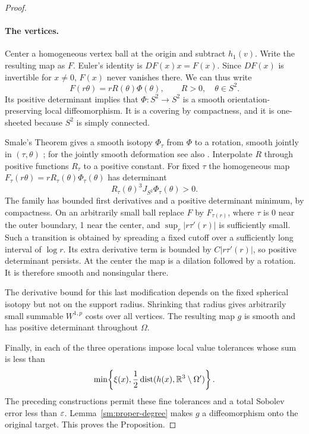 \begin{proof}
\paragraph{The vertices.}
Center a homogeneous vertex ball at the origin and subtract
$h_1(v)$.  Write the resulting map as $F$.  Euler's identity is
$DF(x)x=F(x)$.  Since $DF(x)$ is invertible for $x\ne0$, $F(x)$
never vanishes there.  We can thus write
\begin{equation}
 \label{sm:vertex-form}
 F(r\theta)=rR(\theta)\Phi(\theta),\qquad
 R>0,\quad\theta\in S^2.
\end{equation}
Its positive determinant implies that $\Phi:S^2\to S^2$ is a
smooth orientation-preserving local diffeomorphism.  It is a
covering by compactness, and it is one-sheeted because $S^2$ is
simply connected.

Smale's Theorem gives a smooth isotopy $\Phi_\tau$ from $\Phi$
to a rotation, smooth jointly in $(\tau,\theta)$
\cite[Theorem~6]{Smale1959}; for the jointly smooth deformation see also
\cite[Theorem~1.5]{LiWatts2011}.  Interpolate $R$ through positive
functions $R_\tau$ to a positive constant.  For fixed $\tau$ the
homogeneous map
$F_\tau(r\theta)=rR_\tau(\theta)\Phi_\tau(\theta)$
has determinant
\[
 R_\tau(\theta)^3 J_{S^2}\Phi_\tau(\theta)>0.
\]
The family has bounded first derivatives and a positive
determinant minimum, by compactness.  On an arbitrarily small
ball replace $F$ by $F_{\tau(r)}$, where $\tau$ is 0 near the
outer boundary, 1 near the center, and
$\sup_r|r\tau'(r)|$ is sufficiently small.  Such a transition
is obtained by spreading a fixed cutoff over a sufficiently
long interval of $\log r$.  Its extra derivative term is
bounded by $C|r\tau'(r)|$, so positive determinant persists.
At the center the map is a dilation followed by a rotation.
It is therefore smooth and nonsingular there.

The derivative bound for this last modification depends on the
fixed spherical isotopy but not on the support radius.  Shrinking
that radius gives arbitrarily small summable $W^{1,p}$ costs
over all vertices.  The resulting map $g$ is smooth and has
positive determinant throughout $\Omega$.

Finally, in each of the three operations impose local value
tolerances whose sum is less than
\[
 \min\!\left\{\xi(x),\frac12
 \operatorname{dist}(h(x),\mathbb R^3\setminus\Omega')\right\}.
\]
The preceding constructions permit these fine tolerances and a
total Sobolev error less than $\varepsilon$.  Lemma~\ref{sm:proper-degree}
makes $g$ a diffeomorphism onto the original target.  This proves
the Proposition.
\end{proof}

